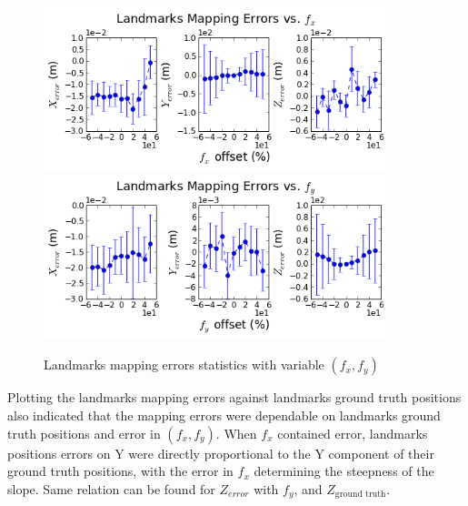 \begin{figure}[h]%
  \centering
  \includegraphics[width=10cm,keepaspectratio=true]{./Figures/SimulationFigures/Figure38.png}
  \includegraphics[width=10cm,keepaspectratio=true]{./Figures/SimulationFigures/Figure39.png}
  \caption{Landmarks mapping errors statistics with variable $(f_x, f_y)$}
  \label{fig:simfig38-39}
\end{figure}

Plotting the landmarks mapping errors against landmarks ground truth
positions also indicated that the mapping errors were dependable on
landmarks ground truth positions and error in $(f_x, f_y)$. When $f_x$
contained error, landmarks positions errors on Y were directly
proportional to the Y component of their ground truth positions, with the
error in $f_x$ determining the steepness of the slope. Same relation can be
found for $Z_{error}$ with $f_y$, and $Z_{\text{ground truth}}$.

